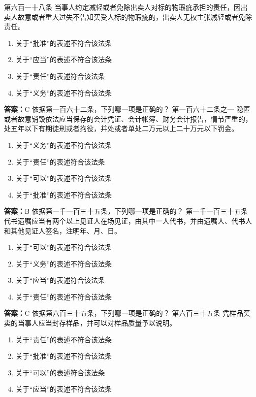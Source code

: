 \documentclass[12pt]{ctexart}
\begin{document}
\begin{questions}
第六百一十八条 当事人约定减轻或者免除出卖人对标的物瑕疵承担的责任，因出卖人故意或者重大过失不告知买受人标的物瑕疵的，出卖人无权主张减轻或者免除责任。
\begin{enumerate}[label=\Alph*.]
\item 关于“批准”的表述不符合该法条
\item 关于“应当”的表述不符合该法条
\item 关于“责任”的表述符合该法条
\item 关于“义务”的表述不符合该法条
\end{enumerate}
\ifprintanswers\par\textbf{答案：}C\fi
\question 依据第一百六十二条，下列哪一项是正确的？
第一百六十二条之一 隐匿或者故意销毁依法应当保存的会计凭证、会计帐簿、财务会计报告，情节严重的，处五年以下有期徒刑或者拘役，并处或者单处二万元以上二十万元以下罚金。
\begin{enumerate}[label=\Alph*.]
\item 关于“义务”的表述不符合该法条
\item 关于“责任”的表述符合该法条
\item 关于“可以”的表述不符合该法条
\item 关于“批准”的表述不符合该法条
\end{enumerate}
\ifprintanswers\par\textbf{答案：}B\fi
\question 依据第一千一百三十五条，下列哪一项是正确的？
第一千一百三十五条 代书遗嘱应当有两个以上见证人在场见证，由其中一人代书，并由遗嘱人、代书人和其他见证人签名，注明年、月、日。
\begin{enumerate}[label=\Alph*.]
\item 关于“可以”的表述不符合该法条
\item 关于“义务”的表述不符合该法条
\item 关于“应当”的表述符合该法条
\item 关于“责任”的表述不符合该法条
\end{enumerate}
\ifprintanswers\par\textbf{答案：}C\fi
\question 依据第六百三十五条，下列哪一项是正确的？
第六百三十五条 凭样品买卖的当事人应当封存样品，并可以对样品质量予以说明。
\begin{enumerate}[label=\Alph*.]
\item 关于“责任”的表述不符合该法条
\item 关于“批准”的表述不符合该法条
\item 关于“可以”的表述符合该法条
\item 关于“应当”的表述不符合该法条
\end{enumerate}

\end{questions}
\end{document}
